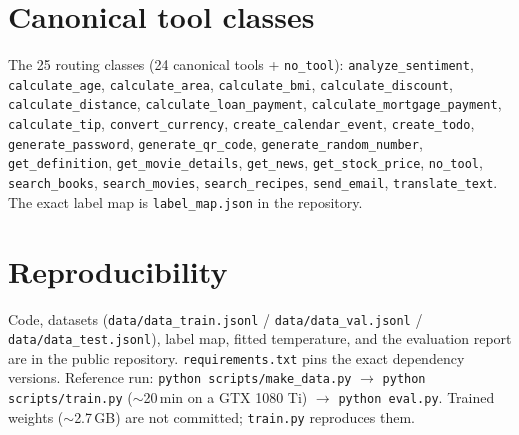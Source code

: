\documentclass{article}
\begin{document}



\appendix

\section{Canonical tool classes}
\label{app:tools}

The 25 routing classes (24 canonical tools + \texttt{no\_tool}):
\texttt{analyze\_sentiment}, \texttt{calculate\_age},
\texttt{calculate\_area}, \texttt{calculate\_bmi},
\texttt{calculate\_discount}, \texttt{calculate\_distance},
\texttt{calculate\_loan\_payment}, \texttt{calculate\_mortgage\_payment},
\texttt{calculate\_tip}, \texttt{convert\_currency},
\texttt{create\_calendar\_event}, \texttt{create\_todo},
\texttt{generate\_password}, \texttt{generate\_qr\_code},
\texttt{generate\_random\_number}, \texttt{get\_definition},
\texttt{get\_movie\_details}, \texttt{get\_news}, \texttt{get\_stock\_price},
\texttt{no\_tool}, \texttt{search\_books}, \texttt{search\_movies},
\texttt{search\_recipes}, \texttt{send\_email}, \texttt{translate\_text}.
The exact label map is \texttt{label\_map.json} in the repository.

\section{Reproducibility}
\label{app:repro}

Code, datasets (\texttt{data/data\_train.jsonl} / \texttt{data/data\_val.jsonl} /
\texttt{data/data\_test.jsonl}), label map, fitted temperature, and the evaluation
report are in the public repository. \texttt{requirements.txt} pins the
exact dependency versions. Reference run: \texttt{python scripts/make\_data.py}
$\to$ \texttt{python scripts/train.py} ($\sim$20\,min on a GTX 1080 Ti) $\to$
\texttt{python eval.py}. Trained weights ($\sim$2.7\,GB) are not committed;
\texttt{train.py} reproduces them.
\end{document}
